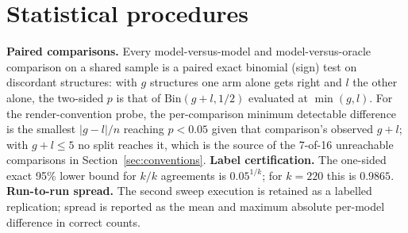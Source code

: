 \section{Statistical procedures}
\label{app:stats}
\textbf{Paired comparisons.} Every model-versus-model and model-versus-oracle comparison on a shared sample
is a paired exact binomial (sign) test on discordant structures: with $g$ structures one arm alone gets
right and $l$ the other alone, the two-sided $p$ is that of $\mathrm{Bin}(g+l, 1/2)$ evaluated at
$\min(g,l)$. For the render-convention probe, the per-comparison minimum detectable difference is the
smallest $|g-l|/n$ reaching $p<0.05$ given that comparison's observed $g+l$; with $g+l \le 5$ no split
reaches it, which is the source of the 7-of-16 unreachable comparisons in
Section~\ref{sec:conventions}.
\textbf{Label certification.} The one-sided exact 95\% lower bound for $k/k$ agreements is
$0.05^{1/k}$; for $k = 220$ this is $0.9865$.
\textbf{Run-to-run spread.} The second sweep execution is retained as a labelled replication; spread is
reported as the mean and maximum absolute per-model difference in correct counts.
